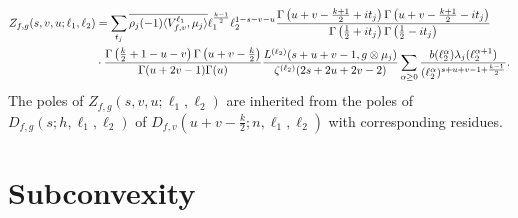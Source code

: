 \documentclass[12pt,reqno,oneside]{amsart}
\begin{document}
    \begin{align*}
      Z_{f,g}(s,v,u;\ell_{1},\ell_{2}) &= \sum_{t_{j}}\overline{\rho_{j}(-1)\langle V_{f,v}^{\ell_{1}},\mu_{j}\rangle}\ell_{1}^{\frac{k-1}{2}}\ell_{2}^{1-s-v-u}\frac{\Gamma\left(u+v-\frac{k+1}{2}+it_{j}\right)\Gamma\left(u+v-\frac{k+1}{2}-it_{j}\right)}{\Gamma\left(\frac{1}{2}+it_{j}\right)\Gamma\left(\frac{1}{2}-it_{j}\right)} \\
      &\cdot \frac{\Gamma\left(\frac{k}{2}+1-u-v\right)\Gamma\left(u+v-\frac{k}{2}\right)}{\Gamma(u+2v-1)\Gamma(u)}\frac{L^{(\ell_{2})}(s+u+v-1,g \otimes \mu_{j})}{\zeta^{(\ell_{2})}(2s+2u+2v-2)}\sum_{\alpha \ge 0}\frac{b(\ell_{2}^{\alpha})\lambda_{j}(\ell_{2}^{\alpha+1})}{(\ell_{2}^{\alpha})^{s+u+v-1+\frac{k-1}{2}}}.
    \end{align*}
    The poles of $Z_{f,g}(s,v,u;\ell_{1},\ell_{2})$ are inherited from the poles of $D_{f,g}(s;h,\ell_{1},\ell_{2})$ of $D_{f,v}\left(u+v-\frac{k}{2};n,\ell_{1},\ell_{2}\right)$ with corresponding residues.
\section{Subconvexity}
\end{document}
